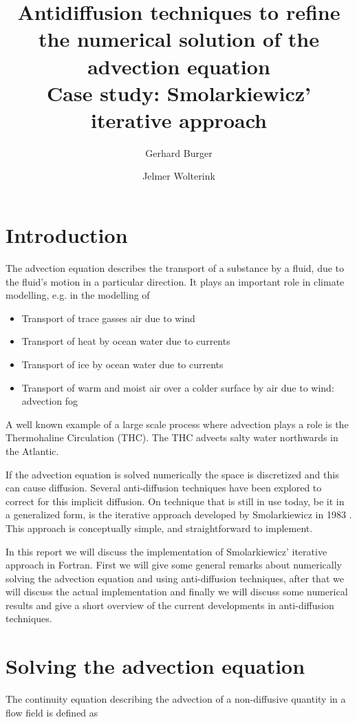 \documentclass[10pt, a4paper]{article}
\author{Gerhard Burger \and Jelmer Wolterink}
\title{Antidiffusion techniques to refine the numerical solution of the advection equation\\ Case study: Smolarkiewicz' iterative approach}
\begin{document}
\maketitle

\section{Introduction}
The advection equation describes the transport of a substance by a fluid, due to the fluid's motion in a particular direction. It plays an important role in climate modelling, e.g. in the modelling of
\begin{itemize}
   \item Transport of trace gasses air due to wind
   \item Transport of heat by ocean water due to currents
   \item Transport of ice by ocean water due to currents
   \item Transport of warm and moist air over a colder surface by air due to wind: advection fog
\end{itemize}

A well known example of a large scale process where advection plays a role is the Thermohaline Circulation (THC). The THC advects salty water northwards in the Atlantic.

If the advection equation is solved numerically the space is discretized and this can cause diffusion. Several anti-diffusion techniques have been explored to correct for this implicit diffusion. On technique that is still in use today, be it in a generalized form, is the iterative approach developed by Smolarkiewicz in 1983 \cite{smolarki}. This approach is conceptually simple, and straightforward to implement.

In this report we will discuss the implementation of Smolarkiewicz' iterative approach in Fortran. First we will give some general remarks about numerically solving the advection equation and using anti-diffusion techniques, after that we will discuss the actual implementation and finally we will discuss some numerical results and give a short overview of the current developments in anti-diffusion techniques.

\section{Solving the advection equation}
\label{sec:solvadveq}
The continuity equation describing the advection of a non-diffusive quantity in a flow field is defined as
\end{document}
